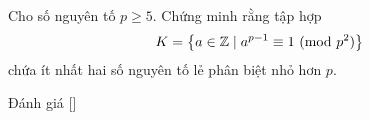 \ifshowproblem
\begin{problem}\label{problem:FRA-2015-RMM-P3}
	Cho số nguyên tố \( p \geq 5 \). Chứng minh rằng tập hợp
	\[
		K = \left\{ a \in \mathbb{Z} \mid a^{p-1} \equiv 1 \ (\mathrm{mod}\ p^2) \right\}
	\]
	chứa ít nhất hai số nguyên tố lẻ phân biệt nhỏ hơn \( p \).
\end{problem}
\fi

\ifshowinfo
Đánh giá [\textbf{}]
\fi